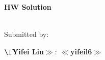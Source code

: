\documentclass[11pt]{article}%
\begin{document}
\noindent\textbf{\LARGE H{}W Solution}\\
\noindent{\textbf{\Course: \CourseName, \Semester}}
\hfill{}%
\\[-0.12cm]
%
\Hr%
\smallskip%

\noindent%
Submitted by:
\begin{compactitem}
    \item \textbf{$\l$Yifei Liu$\gg$}:
    \textbf{$\ll$yifeil6$\gg$}
\end{compactitem}
\Hr
\medskip
\SaveIndent%

\begin{questions}[start=1]
    \item {}
\end{questions}
\pagebreak
\begin{questions}[start=2]
    \item {}
\end{questions}
\end{document}
